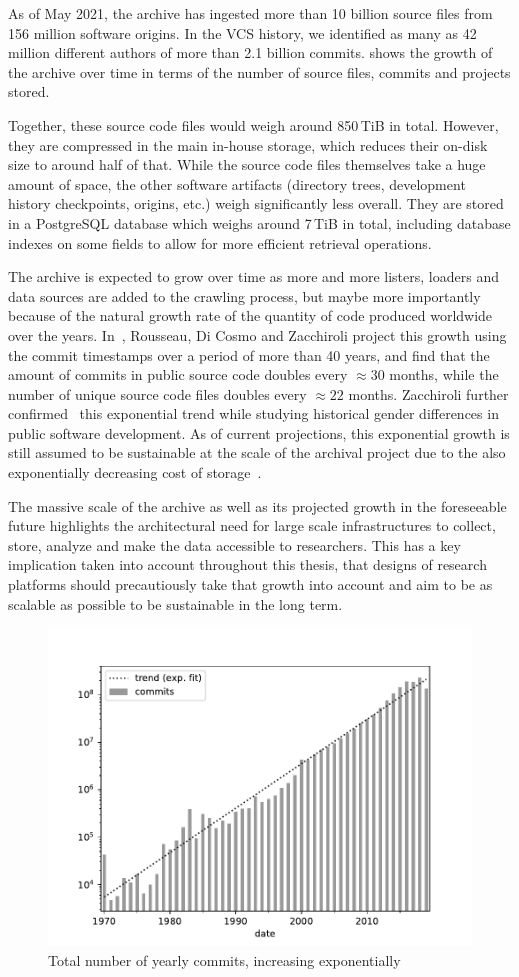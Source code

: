 As of May 2021, the archive has ingested more than 10 billion source files from
156 million software origins. In the \gls{VCS} history, we identified as many
as 42 million different authors of more than 2.1 billion commits.
 shows the growth of the archive over time in terms of the
number of source files, commits and projects stored.

Together, these source code files would weigh around 850\,TiB in total.
However, they are compressed in the main in-house storage, which reduces their
on-disk size to around half of that. While the
source code files themselves take a huge amount of space, the other software
artifacts (directory trees, development history checkpoints, origins, etc.)
weigh significantly less overall. They are stored in a PostgreSQL database
which weighs around 7\,TiB in total, including database indexes on some fields
to allow for more efficient retrieval operations.

The archive is expected to grow over time as more and more listers,
loaders and data sources are added to the crawling process, but maybe more
importantly because of the natural growth rate of the quantity of code produced
worldwide over the years. In~\cite{swh-provenance-emse}, Rousseau, Di Cosmo and
Zacchiroli project this growth using the commit timestamps over a period of
more than 40 years, and find that the amount of commits in public source code
doubles every $\approx 30$ months, while the number of unique source code files
doubles every $\approx 22$ months. Zacchiroli further
confirmed~\cite{ieee-sw-gender-swh} this exponential trend while studying
historical gender differences in public software development. As of current
projections, this exponential growth is still assumed to be sustainable at the
scale of the archival project due to the also exponentially decreasing cost of
storage~\cite{swh-provenance-emse}.

The massive scale of the archive as well as its projected growth in the
foreseeable future highlights the architectural need for large scale
infrastructures to collect, store, analyze and make the data accessible to
researchers. This has a key implication taken into account throughout this
thesis, that designs of research platforms should precautiously take that
growth into account and aim to be as scalable as possible to be sustainable in
the long term.

\begin{figure}
    \centering
    \includegraphics[width=0.5\linewidth]{img/commit-growth}
    \caption{Total number of yearly commits, increasing
    exponentially~\cite{ieee-sw-gender-swh}}%
    \label{fig:swh-commit-growth}
\end{figure}
